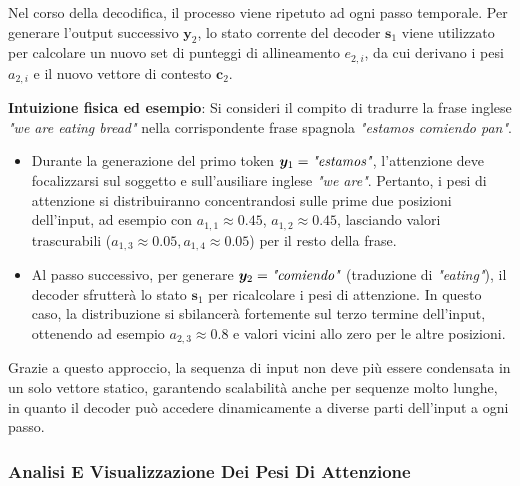 ﻿\documentclass[11pt, a4paper]{article}
\begin{document}
Nel corso della decodifica, il processo viene ripetuto ad ogni passo temporale. Per generare l'output successivo $\bm{y}_2$, lo stato corrente del decoder $\bm{s}_1$ viene utilizzato per calcolare un nuovo set di punteggi di allineamento $e_{2,i}$, da cui derivano i pesi $a_{2,i}$ e il nuovo vettore di contesto $\bm{c}_2$.


\textbf{Intuizione fisica ed esempio}:
Si consideri il compito di tradurre la frase inglese \emph{"we are eating bread"} nella corrispondente frase spagnola \emph{"estamos comiendo pan"}.
\begin{itemize}
    \item Durante la generazione del primo token $\bm{y}_1 = \emph{"estamos"}$, l'attenzione deve focalizzarsi sul soggetto e sull'ausiliare inglese \emph{"we are"}. Pertanto, i pesi di attenzione si distribuiranno concentrandosi sulle prime due posizioni dell'input, ad esempio con $a_{1,1} \approx 0.45$, $a_{1,2} \approx 0.45$, lasciando valori trascurabili ($a_{1,3} \approx 0.05, a_{1,4} \approx 0.05$) per il resto della frase.
    \item Al passo successivo, per generare $\bm{y}_2 = \emph{"comiendo"}$ (traduzione di \emph{"eating"}), il decoder sfrutterà lo stato $\bm{s}_1$ per ricalcolare i pesi di attenzione. In questo caso, la distribuzione si sbilancerà fortemente sul terzo termine dell'input, ottenendo ad esempio $a_{2,3} \approx 0.8$ e valori vicini allo zero per le altre posizioni.
\end{itemize}


Grazie a questo approccio, la sequenza di input non deve più essere condensata in un solo vettore statico, garantendo scalabilità anche per sequenze molto lunghe, in quanto il decoder può accedere dinamicamente a diverse parti dell'input a ogni passo.

\subsubsection{Analisi E Visualizzazione Dei Pesi Di Attenzione}
\end{document}
